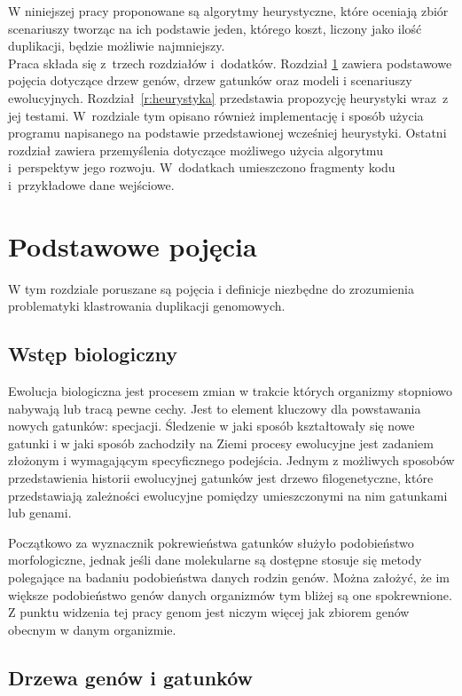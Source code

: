 \documentclass[licencjacka]{pracamgr}
\begin{document}
W niniejszej pracy proponowane są algorytmy heurystyczne, które oceniają zbiór scenariuszy tworząc na ich podstawie jeden, którego koszt, liczony jako ilość duplikacji, będzie możliwie najmniejszy.
\\
Praca składa się z~trzech rozdziałów i~dodatków.
Rozdział \ref{r:pojecia} zawiera podstawowe pojęcia dotyczące drzew genów, drzew gatunków oraz modeli i scenariuszy ewolucyjnych.  
Rozdział~\ref{r:heurystyka} przedstawia propozycję heurystyki wraz~z jej testami.  W~rozdziale tym opisano również implementację i sposób użycia programu napisanego na podstawie przedstawionej wcześniej heurystyki.
Ostatni rozdział zawiera przemyślenia dotyczące możliwego użycia algorytmu i~perspektyw jego rozwoju. W~dodatkach umieszczono fragmenty kodu i~przykładowe dane wejściowe.

\chapter{Podstawowe pojęcia}\label{r:pojecia}

W tym rozdziale poruszane są pojęcia i definicje niezbędne do zrozumienia problematyki klastrowania duplikacji genomowych. 
\section{Wstęp biologiczny}

Ewolucja biologiczna jest procesem zmian w trakcie których organizmy stopniowo nabywają lub tracą pewne cechy. Jest to element kluczowy dla powstawania nowych gatunków: specjacji. Śledzenie w jaki sposób kształtowały się nowe gatunki i w jaki sposób zachodziły na Ziemi procesy ewolucyjne jest zadaniem złożonym i wymagającym specyficznego podejścia. Jednym z możliwych sposobów przedstawienia historii ewolucyjnej gatunków jest drzewo filogenetyczne, które przedstawiają zależności ewolucyjne pomiędzy umieszczonymi na nim gatunkami lub genami. 

Początkowo za wyznacznik pokrewieństwa gatunków służyło podobieństwo morfologiczne, jednak jeśli dane molekularne są dostępne stosuje się metody polegające na badaniu podobieństwa danych rodzin genów. Można założyć, że im większe podobieństwo genów danych organizmów tym bliżej są one spokrewnione. Z punktu widzenia tej pracy genom jest niczym więcej jak zbiorem genów obecnym w danym organizmie. 


\section{Drzewa genów i gatunków}
\end{document}

